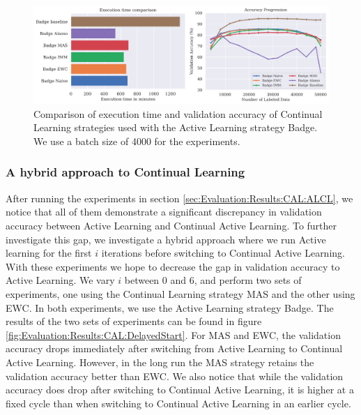 \begin{figure}[h]
    \centering
    \includegraphics[width=\linewidth]{images/results_CAL/Badge_CAL_4000b.png}
    \caption[Continual Active Learning Badge 4000 batch size]{Comparison of execution time and validation accuracy of Continual Learning strategies used with the Active Learning strategy
    Badge. We use a batch size of 4000 for the experiments.}
    \label{fig:Evaluation:Results:CAL:Badge4000}
\end{figure}

\subsubsection{A hybrid approach to Continual Learning}
\label{sec:Evaluation:Results:CAL:Hybrid}
After running the experiments in section \ref{sec:Evaluation:Results:CAL:ALCL}, we notice that all of them demonstrate a significant discrepancy in validation accuracy between Active Learning and Continual Active Learning. To further investigate this gap,
we investigate a hybrid approach where we run Active learning for the first $i$ iterations before switching to Continual Active Learning. With these experiments we hope to decrease the gap in validation accuracy to Active Learning. We vary $i$ between 0 and 6,
and perform two sets of experiments, one using the Continual Learning strategy MAS and the other using EWC. In both experiments, we use the Active Learning strategy Badge. The results of the two sets of experiments can be found in figure 
\ref{fig:Evaluation:Results:CAL:DelayedStart}. For MAS and EWC, the validation accuracy drops immediately after switching from Active Learning to Continual Active Learning. However, in the long run the MAS strategy retains the validation accuracy better than EWC.
We also notice that while the validation accuracy does drop after switching to Continual Active Learning, it is higher at a fixed cycle than when switching to Continual Active Learning in an earlier cycle. \par

